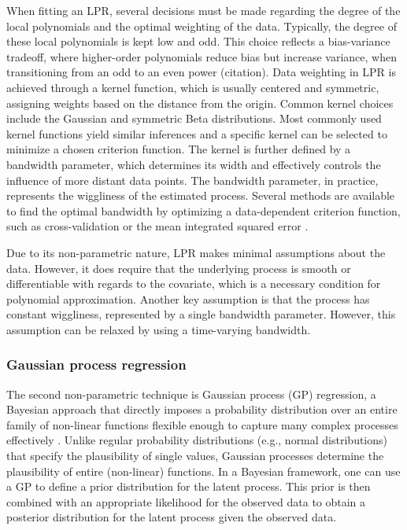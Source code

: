 \documentclass[man, floatsintext]{apa7}
\begin{document}
When fitting an LPR, several decisions must be
made regarding the degree of the local polynomials and the optimal weighting of
the data. Typically, the degree of these local polynomials is kept low and odd.
This choice reflects a bias-variance tradeoff, where higher-order polynomials
reduce bias but increase variance, when transitioning from an odd
to an even power (citation). Data weighting in LPR is achieved through a kernel
function, which is usually centered and symmetric, assigning weights based on
the distance from the origin. Common kernel choices include the Gaussian and
symmetric Beta distributions. Most commonly used kernel functions yield similar
inferences and a specific kernel can be selected to minimize a chosen criterion
function. The kernel is further defined by a bandwidth
parameter, which determines its width and effectively controls the influence of
more distant data points. The bandwidth parameter, in practice, represents the
wiggliness of the estimated process.
Several methods are available to find the optimal bandwidth by optimizing a
data-dependent criterion function, such as cross-validation or the mean
integrated squared error \parencite{kohler_review_2014, debruyne_model_2008}.

Due to its non-parametric nature, LPR makes minimal assumptions about the data.
However, it does require that the underlying process is smooth or
differentiable with regards to the covariate, which is
a necessary condition for polynomial approximation.
Another key assumption is that the process has constant
wiggliness, represented by a single bandwidth parameter. However,
this assumption can be relaxed by using a time-varying bandwidth.

\subsubsection{Gaussian process regression}

The second non-parametric technique is Gaussian process (GP) regression, a
Bayesian approach that directly imposes a probability distribution over an
entire family of non-linear functions flexible enough to capture many complex
processes effectively \parencite{rasmussen_gaussian_2006,
  betancourt_robust_2020, roberts_gaussian_2013}. Unlike regular probability
distributions (e.g., normal distributions) that specify the plausibility of
single values, Gaussian processes determine the plausibility of entire
(non-linear) functions. In a Bayesian framework, one can use a GP to define
a prior distribution for the latent process. This prior is then combined
with an appropriate likelihood for the observed data to obtain a posterior
distribution for the latent process given the observed data.
\end{document}
